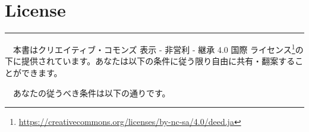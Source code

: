\documentclass[
  12pt,
]{book}
\DeclareRobustCommand{\href}[2]{#2\footnote{\url{#1}}}
\begin{document}
\newenvironment{rmdblock}[1]
  {
  \begin{itemize}
  \renewcommand{\labelitemi}{
    \raisebox{-.7\height}[0pt][0pt]{
      {\setkeys{Gin}{width=3em,keepaspectratio}}
    }
  }
  \setlength{\fboxsep}{1em}
  \begin{kframe}
  \item
  }
  {
  \end{kframe}
  \end{itemize}
  }
\newenvironment{rmdnote}
  {\begin{rmdblock}{note}}
  {\end{rmdblock}}
\newenvironment{rmdcaution}
  {\begin{rmdblock}{caution}}
  {\end{rmdblock}}
\newenvironment{rmdimportant}
  {\begin{rmdblock}{important}}
  {\end{rmdblock}}
\newenvironment{rmdtip}
  {\begin{rmdblock}{tip}}
  {\end{rmdblock}}
\newenvironment{rmdwarning}
  {\begin{rmdblock}{warning}}
  {\end{rmdblock}}

{
\hypersetup{linkcolor=}
\setcounter{tocdepth}{3}
\tableofcontents
}
\listoffigures
\listoftables
{}
\hypertarget{license}{%
\chapter*{License}\label{license}}

\begin{center}\rule{0.5\linewidth}{0.5pt}\end{center}

　本書は\href{https://creativecommons.org/licenses/by-nc-sa/4.0/deed.ja}{クリエイティブ・コモンズ 表示 - 非営利 - 継承 4.0 国際 ライセンス}の下に提供されています。あなたは以下の条件に従う限り自由に共有・翻案することができます。

　あなたの従うべき条件は以下の通りです。
\end{document}
